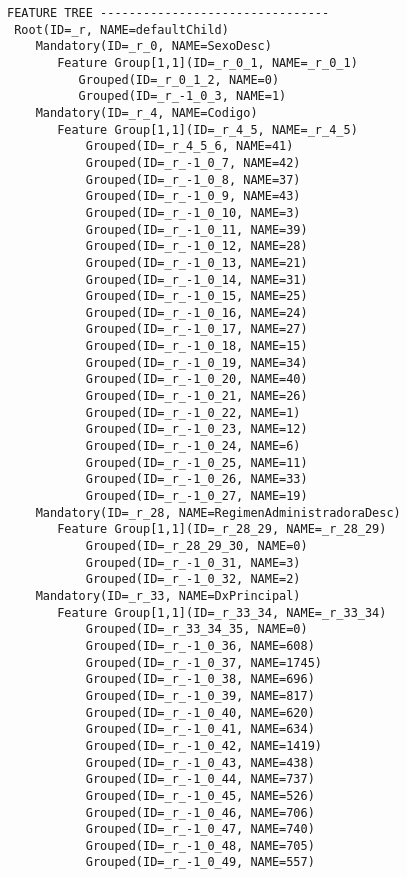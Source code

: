  \begin{lstlisting}[framexleftmargin=8mm, frame=single,label=XMLFeatureModelParserSample.java, title=\textbf{XMLFeatureModelParserSample.java}, caption= Ejemplo de la lectura del archivo RIPStreePrunedPMML.xml.sxfm generado por la clase en /tamarindo/src/main/java/org/XMLFeatureModelParserSample.java]
 FEATURE TREE --------------------------------
 Root(ID=_r, NAME=defaultChild)
    Mandatory(ID=_r_0, NAME=SexoDesc)
       Feature Group[1,1](ID=_r_0_1, NAME=_r_0_1)
          Grouped(ID=_r_0_1_2, NAME=0)
          Grouped(ID=_r_-1_0_3, NAME=1)
    Mandatory(ID=_r_4, NAME=Codigo)
       Feature Group[1,1](ID=_r_4_5, NAME=_r_4_5)
           Grouped(ID=_r_4_5_6, NAME=41)
           Grouped(ID=_r_-1_0_7, NAME=42)
           Grouped(ID=_r_-1_0_8, NAME=37)
           Grouped(ID=_r_-1_0_9, NAME=43)
           Grouped(ID=_r_-1_0_10, NAME=3)
           Grouped(ID=_r_-1_0_11, NAME=39)
           Grouped(ID=_r_-1_0_12, NAME=28)
           Grouped(ID=_r_-1_0_13, NAME=21)
           Grouped(ID=_r_-1_0_14, NAME=31)
           Grouped(ID=_r_-1_0_15, NAME=25)
           Grouped(ID=_r_-1_0_16, NAME=24)
           Grouped(ID=_r_-1_0_17, NAME=27)
           Grouped(ID=_r_-1_0_18, NAME=15)
           Grouped(ID=_r_-1_0_19, NAME=34)
           Grouped(ID=_r_-1_0_20, NAME=40)
           Grouped(ID=_r_-1_0_21, NAME=26)
           Grouped(ID=_r_-1_0_22, NAME=1)
           Grouped(ID=_r_-1_0_23, NAME=12)
           Grouped(ID=_r_-1_0_24, NAME=6)
           Grouped(ID=_r_-1_0_25, NAME=11)
           Grouped(ID=_r_-1_0_26, NAME=33)
           Grouped(ID=_r_-1_0_27, NAME=19)
    Mandatory(ID=_r_28, NAME=RegimenAdministradoraDesc)
       Feature Group[1,1](ID=_r_28_29, NAME=_r_28_29)
           Grouped(ID=_r_28_29_30, NAME=0)
           Grouped(ID=_r_-1_0_31, NAME=3)
           Grouped(ID=_r_-1_0_32, NAME=2)
    Mandatory(ID=_r_33, NAME=DxPrincipal)
       Feature Group[1,1](ID=_r_33_34, NAME=_r_33_34)
           Grouped(ID=_r_33_34_35, NAME=0)
           Grouped(ID=_r_-1_0_36, NAME=608)
           Grouped(ID=_r_-1_0_37, NAME=1745)
           Grouped(ID=_r_-1_0_38, NAME=696)
           Grouped(ID=_r_-1_0_39, NAME=817)
           Grouped(ID=_r_-1_0_40, NAME=620)
           Grouped(ID=_r_-1_0_41, NAME=634)
           Grouped(ID=_r_-1_0_42, NAME=1419)
           Grouped(ID=_r_-1_0_43, NAME=438)
           Grouped(ID=_r_-1_0_44, NAME=737)
           Grouped(ID=_r_-1_0_45, NAME=526)
           Grouped(ID=_r_-1_0_46, NAME=706)
           Grouped(ID=_r_-1_0_47, NAME=740)
           Grouped(ID=_r_-1_0_48, NAME=705)
           Grouped(ID=_r_-1_0_49, NAME=557)

\end{lstlisting}
